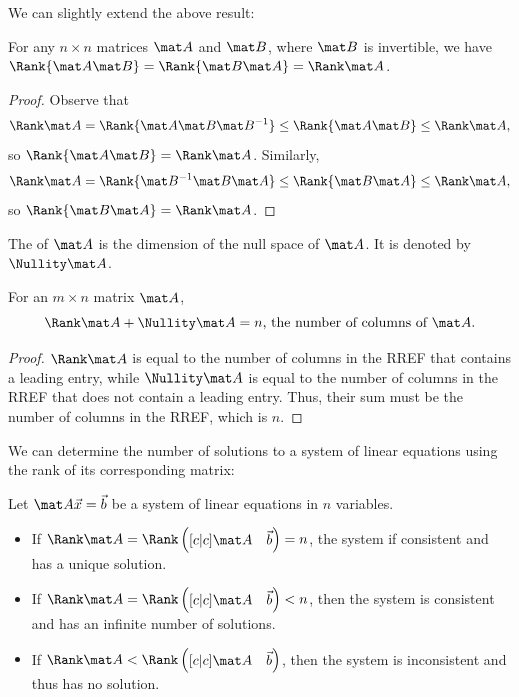 We can slightly extend the above result:

\begin{proposition}
    For any $n \times n$ matrices $\mat A$ and $\mat B$, where $\mat B$ is invertible, we have $\Rank{\mat A \mat B} = \Rank{\mat B \mat A} = \Rank \mat A$.
\end{proposition}
\begin{proof}
    Observe that \[\Rank \mat A = \Rank{\mat A \mat B \mat B^{-1}} \leq \Rank{\mat A \mat B} \leq \Rank \mat A,\] so $\Rank{\mat A \mat B} = \Rank \mat A$. Similarly, \[\Rank \mat A = \Rank{\mat B^{-1} \mat B \mat A} \leq \Rank{\mat B \mat A} \leq \Rank \mat A,\] so $\Rank{\mat B \mat A} = \Rank \mat A$.
\end{proof}

\begin{definition}
    The  of $\mat A$ is the dimension of the null space of $\mat A$. It is denoted by $\Nullity \mat A$.
\end{definition}

\begin{theorem}
    For an $m \times n$ matrix $\mat A$, \[\Rank \mat A + \Nullity \mat A = \text{$n$, the number of columns of $\mat A$}.\]
\end{theorem}
\begin{proof}
    $\Rank \mat A$ is equal to the number of columns in the RREF that contains a leading entry, while $\Nullity \mat A$ is equal to the number of columns in the RREF that does not contain a leading entry. Thus, their sum must be the number of columns in the RREF, which is $n$.
\end{proof}

We can determine the number of solutions to a system of linear equations using the rank of its corresponding matrix:

\begin{recipe}
    Let $\mat A \vec x = \vec b$ be a system of linear equations in $n$ variables.
    \begin{itemize}
        \item If $\Rank \mat A = \Rank \begin{pmatrix}[c|c] \mat A & \vec b\end{pmatrix} = n$, the system if consistent and has a unique solution.
        \item If $\Rank \mat A = \Rank \begin{pmatrix}[c|c] \mat A & \vec b\end{pmatrix} < n$, then the system is consistent and has an infinite number of solutions.
        \item If $\Rank \mat A < \Rank \begin{pmatrix}[c|c] \mat A & \vec b\end{pmatrix}$, then the system is inconsistent and thus has no solution.
    \end{itemize}
\end{recipe}

